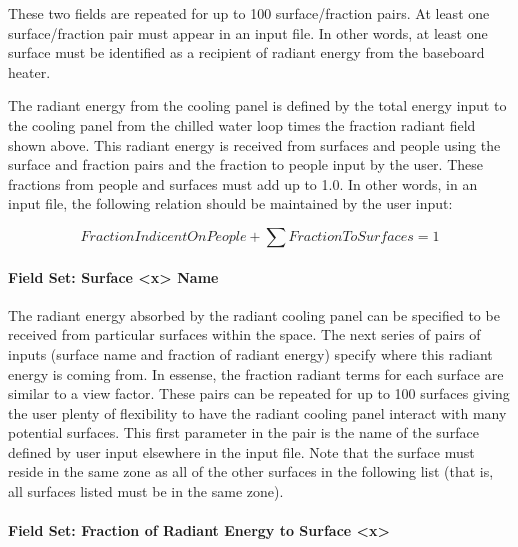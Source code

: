 These two fields are repeated for up to 100 surface/fraction pairs. At least one surface/fraction pair must appear in an input file. In other words, at least one surface must be identified as a recipient of radiant energy from the baseboard heater.

The radiant energy from the cooling panel is defined by the total energy input to the cooling panel from the chilled water loop times the fraction radiant field shown above. This radiant energy is received from surfaces and people using the surface and fraction pairs and the fraction to people input by the user. These fractions from people and surfaces must add up to 1.0. In other words, in an input file, the following relation should be maintained by the user input:

\begin{equation}
FractionIndicentOnPeople + \sum {FractionToSurfaces} = 1
\end{equation}

\paragraph{Field Set: Surface \textless{}x\textgreater{} Name}\label{field-set-surface-x-name-1}

The radiant energy absorbed by the radiant cooling panel can be specified to be received from particular surfaces within the space.  The next series of pairs of inputs (surface name and fraction of radiant energy) specify where this radiant energy is coming from.  In essense, the fraction radiant terms for each surface are similar to a view factor.  These pairs can be repeated for up to 100 surfaces giving the user plenty of flexibility to have the radiant cooling panel interact with many potential surfaces.  This first parameter in the pair is the name of the surface defined by user input elsewhere in the input file.  Note that the surface must reside in the same zone as all of the other surfaces in the following list (that is, all surfaces listed must be in the same zone).

\paragraph{Field Set: Fraction of Radiant Energy to Surface \textless{}x\textgreater{}}\label{field-set-fraction-of-radiant-energy-to-surface-x-1}

